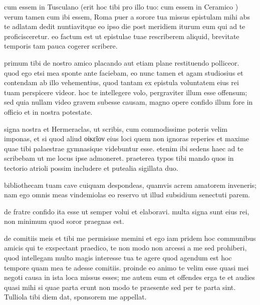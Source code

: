 


 cum essem in Tusculano (erit hoc tibi pro illo tuo: cum essem in Ceramico ) verum tamen cum ibi essem, Roma puer a sorore tua missus epistulam mihi abs te adlatam dedit nuntiavitque eo ipso die post meridiem iturum eum qui ad te proficisceretur. eo factum est ut epistulae tuae rescriberem aliquid, brevitate temporis tam pauca cogerer scribere.

 primum tibi de nostro amico placando aut etiam plane restituendo polliceor. quod ego etsi mea sponte ante faciebam, eo nunc tamen et agam studiosius et contendam ab illo vehementius, quod tantam ex epistula voluntatem eius rei tuam perspicere videor. hoc te intellegere volo, pergraviter illum esse offensum; sed quia nullam video gravem subesse causam, magno opere confido illum fore in officio et in nostra potestate.

 signa nostra et Hermeraclas, ut scribis, cum commodissime poteris velim imponas, et si quod aliud οἰκεῖον eius loci quem non ignoras reperies et maxime quae tibi palaestrae gymnasique videbuntur esse. etenim ibi sedens haec ad te scribebam ut me locus ipse admoneret. praeterea typos tibi mando quos in tectorio atrioli possim includere et putealia sigillata duo.

 bibliothecam tuam cave cuiquam despondeas, quamvis acrem amatorem inveneris; nam ego omnis meas vindemiolas eo reservo ut illud subsidium senectuti parem.

 de fratre confido ita esse ut semper volui et elaboravi. multa signa sunt eius rei, non minimum quod soror praegnas est.

 de comitiis meis et tibi me permisisse memini et ego iam pridem hoc communibus amicis qui te exspectant praedico, te non modo non arcessi a me sed prohiberi, quod intellegam multo magis interesse tua te agere quod agendum est hoc tempore quam mea te adesse comitiis. proinde eo animo te velim esse quasi mei negoti causa in ista loca missus esses; me autem eum et offendes erga te et audies quasi mihi si quae parta erunt non modo te praesente sed per te parta sint. Tulliola tibi diem dat, sponsorem me appellat.
